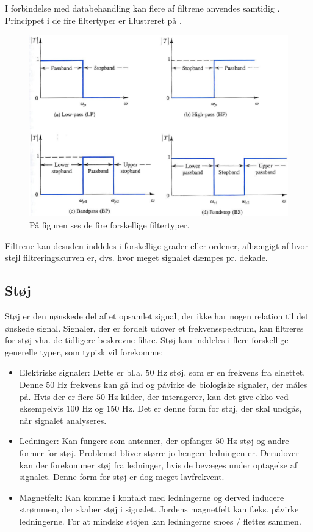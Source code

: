 I forbindelse med databehandling kan flere af filtrene anvendes samtidig \cite{Devasahayam2000}. Princippet i de fire filtertyper er illustreret på .
\begin{figure}[H]
\centering
\includegraphics[scale=0.5]{figures/bproblemanalyse/filtertyper2.png}
\caption{På figuren ses de fire forskellige filtertyper.\cite{Sedra2010}}
\label{filtertyper}
\end{figure}
Filtrene kan desuden inddeles i forskellige grader eller ordener, afhængigt af hvor stejl filtreringskurven er, dvs. hvor meget signalet dæmpes pr. dekade\cite{Sedra2010}.

\subsection{Støj}\label{StoejAfsnit}
Støj er den uønskede del af et opsamlet signal, der ikke har nogen relation til det ønskede signal. Signaler, der er fordelt udover et frekvensspektrum, kan filtreres for støj vha. de tidligere beskrevne filtre. \cite{Devasahayam2000,Wolf2004}
Støj kan inddeles i flere forskellige generelle typer, som typisk vil forekomme:

\begin{itemize}
\item Elektriske signaler: Dette er bl.a. $50$ Hz støj, som er en frekvens fra elnettet. Denne $50$ Hz frekvens kan gå ind og påvirke de biologiske signaler, der måles på. Hvis der er flere $50$ Hz kilder, der interagerer, kan det give ekko ved eksempelvis $100$ Hz og $150$ Hz. Det er denne form for støj, der skal undgås, når signalet analyseres.
\item Ledninger: Kan fungere som antenner, der opfanger $50$ Hz støj og andre former for støj. Problemet bliver større jo længere ledningen er. Derudover kan der forekommer støj fra ledninger, hvis de bevæges under optagelse af signalet. Denne form for støj er dog meget lavfrekvent. \cite{Webster2009}
\item Magnetfelt: Kan komme i kontakt med ledningerne og derved inducere strømmen, der skaber støj i signalet. Jordens magnetfelt kan f.eks. påvirke ledningerne. For at mindske støjen kan ledningerne snoes / flettes sammen. \cite{Wolf2004}
\end{itemize} 